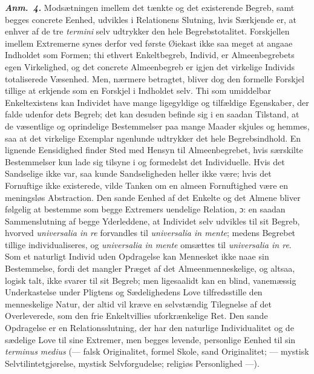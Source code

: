 \documentclass[12pt]{book}
\newcommand{\anm}[1]{\emph{\textbf{Anm.~#1.}}}
\newcommand{\dsi}{\textup{ɔ:}}
\newcommand{\opage}[1]{\marginnote{\footnotesize\textit{[#1]}}}
\begin{document}
\anm{4} Modsætningen imellem det tænkte og det existerende Begreb, samt begges
concrete Eenhed, udvikles i Relationens Slutning, hvis Særkjende er, at enhver af de
tre \textit{termini} selv udtrykker den hele Begrebstotalitet. Forskjellen imellem
Extremerne synes derfor ved første Øiekast ikke saa meget at angaae Indholdet som
Formen; thi ethvert Enkeltbegreb, Individ, er Almeenbegrebets egen Virkelighed, og
det concrete Almeenbegreb er igjen det virkelige Individs totaliserede Væsenhed.
Men, nærmere betragtet, bliver dog den formelle Forskjel tillige at erkjende som en
Forskjel i Indholdet selv. Thi som umiddelbar Enkeltexistens kan Individet have
mange ligegyldige og tilfældige Egenskaber, der falde udenfor dets Begreb; det kan
desuden befinde sig i en saadan Tilstand, at de væsentlige og oprindelige
Bestemmelser paa mange
\opage{83} %
Maader skjules og hemmes, saa at det virkelige Exemplar ngenlunde udtrykker det hele
Begrebsindhold. En lignende Eensidighed finder Sted med Hensyn til Almeenbegrebet,
hvis særskilte Bestemmelser kun lade sig tilsyne i og formedelst det Individuelle.
Hvis det Sandselige ikke var, saa kunde Sandseligheden heller ikke være; hvis det
Fornuftige ikke existerede, vilde Tanken om en almeen Fornuftighed være en
meningsløs Abstraction. Den sande Eenhed af det Enkelte og det Almene bliver
følgelig at bestemme som begge Extremers uendelige Relation, \dsi{} en saadan
Sammenslutning af begge Yderleddene, at Individet selv udvikles til sit Begreb,
hvorved \textit{universalia in re} forvandles til \textit{universalia in mente};
medens Begrebet tillige individualiseres, og \textit{universalia in mente} omsættes
til \textit{universalia in re}. Som et naturligt Individ uden Opdragelse kan
Mennesket ikke naae sin Bestemmelse, fordi det mangler Præget af det
Almeenmenneskelige, og altsaa, logisk talt, ikke svarer til sit Begreb; men
ligesaalidt kan en blind, vanemæssig Underkastelse under Pligtens og Sædelighedens
Love tilfredsstille den menneskelige Natur, der altid vil kræve en selvstændig
Tilegnelse af det Overleverede, som den frie Enkeltvillies uforkrænkelige Ret. Den
sande Opdragelse er en Relationsslutning, der har den naturlige Individualitet og de
sædelige Love til sine Extremer, men begges levende, personlige Eenhed til sin
\textit{terminus medius} (--- falsk Originalitet, formel Skole, sand Originalitet;
--- mystisk Selvtilintetgjørelse, mystisk Selvforgudelse; religiøs Personlighed
---).
\end{document}
